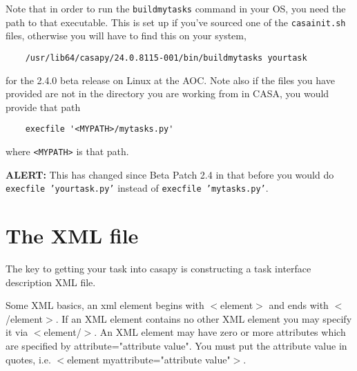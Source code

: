 Note that in order to run the {\tt buildmytasks} command in your OS,
you need the path to that executable.  This is set up if you've sourced
one of the {\tt casainit.sh} files, otherwise you will have to find
this on your system, 
\begin{verbatim}
    /usr/lib64/casapy/24.0.8115-001/bin/buildmytasks yourtask
\end{verbatim}
for the 2.4.0 beta release on Linux at the AOC.  Note also if the files you have
provided are not in the directory you are working from in CASA, you
would provide that path
\begin{verbatim}
    execfile '<MYPATH>/mytasks.py'
\end{verbatim}
where {\tt <MYPATH>} is that path.

{\bf ALERT:} This has changed since Beta Patch 2.4 in that before you
would do {\tt execfile 'yourtask.py'} instead of {\tt execfile 'mytasks.py'}.


\section{The XML file}
\label{section:write.xml}

The key to getting your task into casapy is constructing a task
interface description XML file.

Some XML basics, an xml element begins with $<$element$>$ and ends
with $<$/element$>$. If an XML element contains no other XML element
you may specify it via $<$element/$>$. An XML element may have zero or
more attributes which are specified by attribute="attribute
value". You must put the attribute value in quotes, i.e. $<$element
myattribute="attribute value"$>$.


